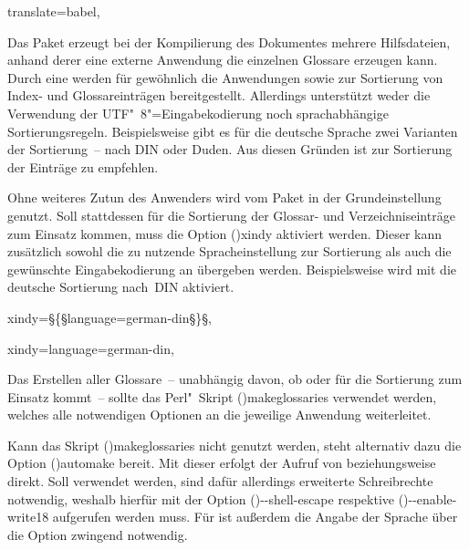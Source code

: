 \documentclass[%
  english,ngerman,%
  cdgeometry=no,DIV=12,%
  cd=false,cdfont=false,cdtitle=true,%
  headings=normal,%
  automark,%
  listof=toc,%
]{tudscrartcl}
\begin{document}
%
\begin{Preamble}
  translate=babel,%
\end{Preamble}
%
Das Paket  erzeugt bei der Kompilierung des Dokumentes 
mehrere Hilfsdateien, anhand derer eine externe Anwendung die einzelnen 
Glossare erzeugen kann. Durch eine \Distro* werden für gewöhnlich die 
Anwendungen  sowie  zur Sortierung 
von Index- und Glossareinträgen bereitgestellt. Allerdings unterstützt 
 weder die Verwendung der UTF"~8"=Eingabekodierung noch 
sprachabhängige Sortierungsregeln. Beispielsweise gibt es für die deutsche 
Sprache zwei Varianten der Sortierung~-- nach DIN oder Duden. Aus diesen 
Gründen ist zur Sortierung der Einträge  zu empfehlen.

Ohne weiteres Zutun des Anwenders wird vom Paket  in der 
Grundeinstellung  genutzt. Soll stattdessen für die 
Sortierung der Glossar- und Verzeichniseinträge  zum Einsatz 
kommen, muss die Option \Option(){xindy} aktiviert werden.
Dieser kann zusätzlich sowohl die zu nutzende Spracheinstellung zur Sortierung 
als auch die gewünschte Eingabekodierung an  übergeben 
werden. Beispielsweise wird mit 
die deutsche Sortierung nach~DIN aktiviert.
%
\begin{Hint}
  xindy=§\{§language=german-din§\}§, %
\end{Hint}
\begin{Preamble+}
  xindy={language=german-din},
\end{Preamble+}
%
Das Erstellen aller Glossare~-- unabhängig davon, ob  oder 
 für die Sortierung zum Einsatz kommt~-- sollte das 
Perl"~Skript \File(){makeglossaries} verwendet werden, 
welches alle notwendigen Optionen an die jeweilige Anwendung weiterleitet.


Kann das Skript \File(){makeglossaries} nicht genutzt 
werden, steht alternativ dazu die Option \Option(){automake}
bereit. Mit dieser erfolgt der Aufruf von  beziehungsweise 
 direkt. Soll  verwendet werden, sind 
dafür allerdings erweiterte Schreibrechte notwendig, weshalb  
hierfür mit der Option \Option(){-{}-shell-escape} respektive 
\Option(){-{}-enable-write18} aufgerufen werden muss. Für 
 ist außerdem die Angabe der Sprache über die Option 
 zwingend notwendig. 
\end{document}
